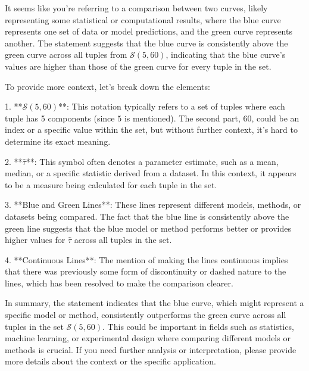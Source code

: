 It seems like you're referring to a comparison between two curves, likely representing some statistical or computational results, where the blue curve represents one set of data or model predictions, and the green curve represents another. The statement suggests that the blue curve is consistently above the green curve across all tuples from \(\mathcal{S}(5, 60)\), indicating that the blue curve's values are higher than those of the green curve for every tuple in the set.

To provide more context, let's break down the elements:

1. **\(\mathcal{S}(5, 60)\)**: This notation typically refers to a set of tuples where each tuple has 5 components (since \(5\) is mentioned). The second part, \(60\), could be an index or a specific value within the set, but without further context, it's hard to determine its exact meaning.

2. **\(\hat{\tau}\)**: This symbol often denotes a parameter estimate, such as a mean, median, or a specific statistic derived from a dataset. In this context, it appears to be a measure being calculated for each tuple in the set.

3. **Blue and Green Lines**: These lines represent different models, methods, or datasets being compared. The fact that the blue line is consistently above the green line suggests that the blue model or method performs better or provides higher values for \(\hat{\tau}\) across all tuples in the set.

4. **Continuous Lines**: The mention of making the lines continuous implies that there was previously some form of discontinuity or dashed nature to the lines, which has been resolved to make the comparison clearer.

In summary, the statement indicates that the blue curve, which might represent a specific model or method, consistently outperforms the green curve across all tuples in the set \(\mathcal{S}(5, 60)\). This could be important in fields such as statistics, machine learning, or experimental design where comparing different models or methods is crucial. If you need further analysis or interpretation, please provide more details about the context or the specific application.